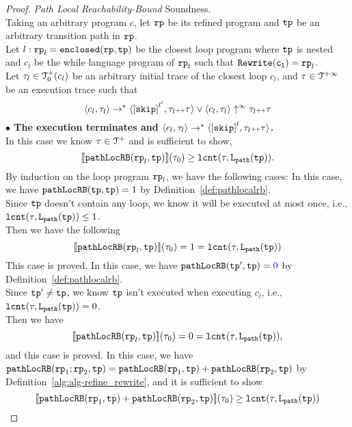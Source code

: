 \begin{proof}
\emph{Path Local Reachability-Bound} Soundness.
\\
Taking an arbitrary program $c$, let $\mathtt{rp}$ be its refined program and $\mathtt{tp}$ be an arbitrary transition path in $\mathtt{rp}$.
\\
Let $l: \mathtt{rp}_l = \mathtt{enclosed}(\mathtt{rp}, \mathtt{tp})$ be the closest loop program where $\mathtt{tp}$ is nested and $c_l$ be the while language program of $\mathtt{rp}_l$ such that $\mathtt{Rewrite(c_l)} = \mathtt{rp}_l$. 
\\
Let $\mathtt{\tau}_l \in \mathcal{T}^{+}_0(c_l)$ be an arbitrary initial trace of the closest loop $c_l$, and $\mathtt{\tau} \in \mathcal{T}^{+\infty} $ be an execution trace such that
\[
  \config{c_l, \trace_l} \to^* \config{\clabel{\eskip}^{l'}, \trace_l \tracecat \trace} \lor \config{c_l, \trace_l} \uparrow^{\infty} \trace_l \tracecat \trace 
\]
\textbf{$\bullet$ The execution terminates and {$\config{{c_l}, \trace_l} \to^{*} \config{\clabel{\eskip}^{l}, \trace_l \tracecat \trace}$}.} 
\\
 In this case we know $\mathtt{\tau} \in \mathcal{T}^{+}$ and is sufficient to show,
\[
  \llbracket \mathtt{pathLocRB}(\mathtt{rp}_l, \mathtt{tp}) \rrbracket(\mathtt{\tau}_0) \geq \mathtt{lcnt}(\mathtt{\tau}, \mathtt{L}_{\mathtt{path}}(\mathtt{tp})).
\]
By induction on the loop program $\mathtt{rp}_l$,
we have the following cases:
In this case, we have $\mathtt{pathLocRB}(\mathtt{tp}, \mathtt{tp}) = 1$ by Definition~\ref{def:pathlocalrb}. 
\\
Since $\mathtt{tp}$ doesn't contain any loop, we know it will be executed at most once,  i.e., $\mathtt{lcnt}(\mathtt{\tau}, \mathtt{L}_{\mathtt{path}}(\mathtt{tp})) \leq 1$.
\\
Then we have the following
\[\llbracket \mathtt{pathLocRB}(\mathtt{rp}_l, \mathtt{tp}) \rrbracket(\mathtt{\tau}_0) = 1 = \mathtt{lcnt}(\mathtt{\tau}, \mathtt{L}_{\mathtt{path}}(\mathtt{tp})) \]
This case is proved.
In this case, we have $\outinB(\tpath', \tpath) = \highlight{0} $ by Definition~\ref{def:pathlocalrb}.
\\
Since $\mathtt{tp}' \neq \mathtt{tp}$, we know $\mathtt{tp}$ isn't executed when executing $c_l$, i.e., $\mathtt{lcnt}(\mathtt{\tau}, \mathtt{L}_{\mathtt{path}}(\mathtt{tp})) = 0$.
\\
Then we have
\[
  \llbracket \mathtt{pathLocRB}(\mathtt{rp}_l, \mathtt{tp}) \rrbracket(\mathtt{\tau}_0) = 0 = \mathtt{lcnt}(\mathtt{\tau}, \mathtt{L}_{\mathtt{path}}(\mathtt{tp})),
  \]
and this case is proved.
In this case, we have $\mathtt{pathLocRB}(\mathtt{rp}_1;\mathtt{rp}_2, \mathtt{tp}) = \mathtt{pathLocRB}(\mathtt{rp}_1, \mathtt{tp}) + \mathtt{pathLocRB}(\mathtt{rp}_2, \mathtt{tp}) $ by Definition~\ref{alg:alg-refine_rewrite}, and
it is sufficient to show
\[
  \llbracket \mathtt{pathLocRB}(\mathtt{rp}_1, \mathtt{tp}) + \mathtt{pathLocRB}(\mathtt{rp}_2, \mathtt{tp}) \rrbracket(\mathtt{\tau}_0) \geq \mathtt{lcnt}(\mathtt{\tau}, \mathtt{L}_{\mathtt{path}}(\mathtt{tp})) 
\]
\end{proof}
